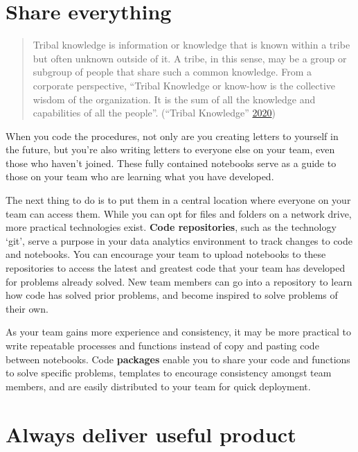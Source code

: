 \documentclass[
]{book}
\begin{document}
\hypertarget{share-everything}{%
\section{Share everything}\label{share-everything}}

\begin{quote}
Tribal knowledge is information or knowledge that is known within a tribe but often unknown outside of it. A tribe, in this sense, may be a group or subgroup of people that share such a common knowledge. From a corporate perspective, ``Tribal Knowledge or know-how is the collective wisdom of the organization. It is the sum of all the knowledge and capabilities of all the people''. (``Tribal Knowledge'' \protect\hyperlink{ref-tribal-knowledge}{2020})
\end{quote}

When you code the procedures, not only are you creating letters to yourself in the future, but you're also writing letters to everyone else on your team, even those who haven't joined. These fully contained notebooks serve as a guide to those on your team who are learning what you have developed.

The next thing to do is to put them in a central location where everyone on your team can access them. While you can opt for files and folders on a network drive, more practical technologies exist. \textbf{Code repositories}, such as the technology `git', serve a purpose in your data analytics environment to track changes to code and notebooks. You can encourage your team to upload notebooks to these repositories to access the latest and greatest code that your team has developed for problems already solved. New team members can go into a repository to learn how code has solved prior problems, and become inspired to solve problems of their own.

As your team gains more experience and consistency, it may be more practical to write repeatable processes and functions instead of copy and pasting code between notebooks. Code \textbf{packages} enable you to share your code and functions to solve specific problems, templates to encourage consistency amongst team members, and are easily distributed to your team for quick deployment.

\hypertarget{always-deliver-useful-product}{%
\section{Always deliver useful product}\label{always-deliver-useful-product}}
\end{document}
